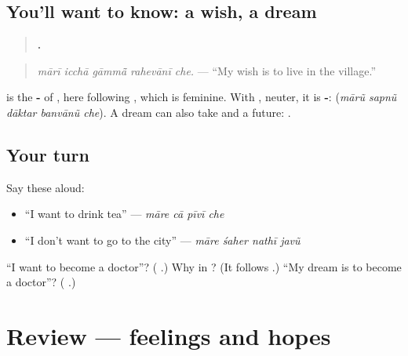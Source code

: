 \subsection*{You'll want to know: a wish, a dream}
\begin{quote}
\textbf{    .}
\end{quote}

\begin{quote}
\emph{mārī icchā gāmmā̃ rahevānī che.} — \textquotedblleft{}My wish is to live in the village.\textquotedblright{}
\end{quote}

\textbf{} is the \textbf{-} of \textbf{  }, here following \textbf{}, which is feminine. With \textbf{}, neuter, it is \textbf{-}: \textbf{    } (\emph{mārũ sapnũ dāktar banvānũ che}). A dream can also take \textbf{} and a future: \textbf{      }.

\subsection*{Your turn}
Say these aloud:

\begin{itemize}
\raggedright
  \item \textquotedblleft{}I want to drink tea\textquotedblright{} — \emph{māre cā pīvī che}
  \item \textquotedblleft{}I don't want to go to the city\textquotedblright{} — \emph{māre śaher nathī javũ}
\end{itemize}

\begin{tcolorbox}[breakable,colback=teal!4,colframe=teal!35!black,title={Before you move on}]
\textquotedblleft{}I want to become a doctor\textquotedblright{}? (\textbf{   }.) Why \textbf{} in \textbf{   }? (It follows \textbf{}.) \textquotedblleft{}My dream is to become a doctor\textquotedblright{}? (\textbf{    }.)
\end{tcolorbox}
\section[(review)]{Review — feelings and hopes}

